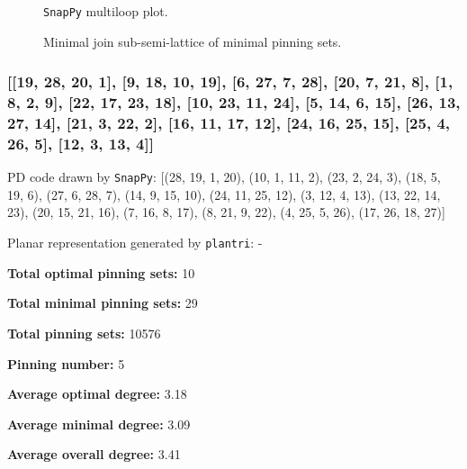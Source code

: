 \documentclass{article}%
\begin{document}
\begin{multicols}{2}
\begin{figure}[H]
\centering

\caption{\texttt{SnapPy} multiloop plot.}
\label{fig:tex/img/[[22, 28, 1, 23], [23, 8, 24, 7], [14, 21, 15, 22], [15, 27, 16, 28], [1, 9, 2, 8], [24, 2, 25, 3], [13, 6, 14, 7], [20, 5, 21, 6], [26, 10, 27, 11], [16, 10, 17, 9], [25, 17, 26, 18], [3, 18, 4, 19],.svg}
\end{figure}
\columnbreak

\begin{figure}[H]
\centering
\scalebox{0.8}{}
\caption{Minimal join sub-semi-lattice of minimal pinning sets.}
\label{fig:tex/img/[[22, 28, 1, 23], [23, 8, 24, 7], [14, 21, 15, 22], [15, 27, 16, 28], [1, 9, 2, 8], [24, 2, 25, 3], [13, 6, 14, 7], [20, 5, 21, 6], [26, 10, 27, 11], [16, 10, 17, 9], [25, 17, 26, 18], [3, 18, 4, 19],.pgf}
\end{figure}
\end{multicols}

\newpage

\subsubsection{[[19, 28, 20, 1], [9, 18, 10, 19], [6, 27, 7, 28], [20, 7, 21, 8], [1, 8, 2, 9], [22, 17, 23, 18], [10, 23, 11, 24], [5, 14, 6, 15], [26, 13, 27, 14], [21, 3, 22, 2], [16, 11, 17, 12], [24, 16, 25, 15], [25, 4, 26, 5], [12, 3, 13, 4]]}

{\small\noindent PD code drawn by \texttt{SnapPy}: [(28, 19, 1, 20), (10, 1, 11, 2), (23, 2, 24, 3), (18, 5, 19, 6), (27, 6, 28, 7), (14, 9, 15, 10), (24, 11, 25, 12), (3, 12, 4, 13), (13, 22, 14, 23), (20, 15, 21, 16), (7, 16, 8, 17), (8, 21, 9, 22), (4, 25, 5, 26), (17, 26, 18, 27)]}

{\small\noindent Planar representation generated by \texttt{plantri}: -}

\begin{multicols}{2}
{\normalsize \noindent\textbf{Total optimal pinning sets:} 10

\noindent\textbf{Total minimal pinning sets:} 29

\noindent\textbf{Total pinning sets:} 10576

\noindent\textbf{Pinning number:} 5

}
\columnbreak

{\normalsize \noindent\textbf{Average optimal degree:} 3.18

\noindent\textbf{Average minimal degree:} 3.09

\noindent\textbf{Average overall degree:} 3.41

}
\end{multicols}
\end{document}
